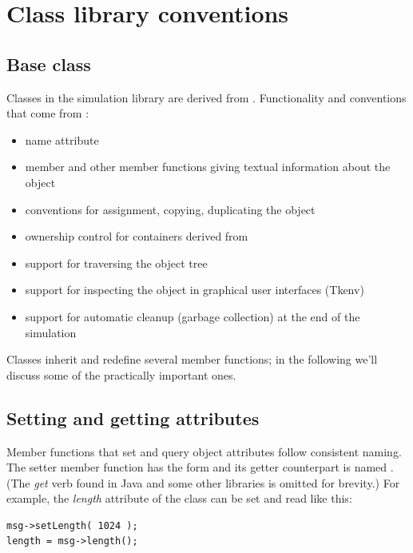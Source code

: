 \section{Class library conventions}

\subsection{Base class}
\label{sec:ch-sim-lib:cobject}


Classes in the {\opp} simulation library are derived from .
Functionality and conventions that come from :
\begin{itemize}
  \item{name attribute}
  \item{ member and other member functions giving textual
    information about the object}
  \item{conventions for assignment, copying, duplicating the object}
  \item{ownership control for containers derived from }
  \item{support for traversing the object tree}
  \item{support for inspecting the object in graphical user interfaces
    (Tkenv)}
  \item{support for automatic cleanup (garbage collection) at the end
    of the simulation}
\end{itemize}


Classes inherit and redefine several  member functions;
in the following we'll discuss some of the practically important
ones.


\subsection{Setting and getting attributes}


Member functions that set and query object attributes follow
consistent naming. The setter member function has the form 
and its getter counterpart is named . (The \textit{get} verb found in Java
and some other libraries is omitted for brevity.)
For example, the \textit{length} attribute of the  class can
be set and read like this:

\begin{verbatim}
msg->setLength( 1024 );
length = msg->length();
\end{verbatim}


